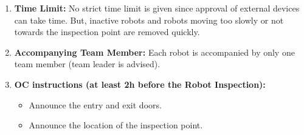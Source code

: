 \begin{enumerate}
	\item \textbf{Time Limit:} No strict time limit is given since approval of external devices can take time. But, inactive robots and robots moving too slowly or not towards the inspection point are removed quickly.
	\item \textbf{Accompanying Team Member:} Each robot is accompanied by only one team member (team leader is advised).
	\item \textbf{OC instructions (at least 2h before the Robot Inspection):}
	\begin{itemize}
		\item Announce the entry and exit doors.
		\item Announce the location of the inspection point.
	\end{itemize}
\end{enumerate}


